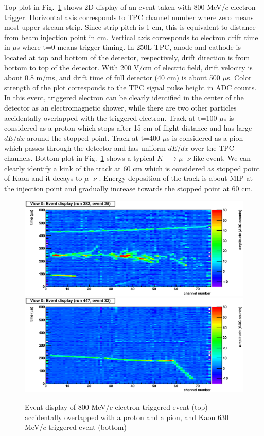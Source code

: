 Top plot in Fig.~\ref{Fig:Textbook} shows 2D display of an event taken with 800 MeV/$c$ electron trigger.
Horizontal axis corresponds to TPC channel number where zero means most upper stream strip. 
Since strip pitch is 1 cm, this is equivalent to distance from beam injection point in cm.
Vertical axis corresponds to electron drift time in $\mu$s
where t=0 means trigger timing. 
In 250L TPC, anode and cathode is located at top and bottom of the detector, respectively,
drift direction is from bottom to top of the detector.
With 200 V/cm of electric field, drift velocity is about 0.8 m/ms,
and drift time of full detector (40 cm) is about 500 $\mu$s.
Color strength of the plot corresponds to the TPC signal pulse height in ADC counts.
In this event, triggered electron can be clearly identified in the center of the detector
as an electromagnetic shower,  while there are two other particles 
accidentally overlapped with the triggered electron. 
Track at t=100 $\mu$s is considered as
a proton which stops after 15 cm of flight distance and 
has large $dE/dx$ around the stopped point.
Track at t=400 $\mu$s is considered as
a pion which passes-through the detector and 
has uniform $dE/dx$ over the TPC channels.
Bottom plot in Fig.~\ref{Fig:Textbook} shows a typical $K^+ \to\mu^+\nu$ like event.
We can clearly identify a kink of the track at 60 cm which is considered
as stopped point of Kaon and it decays to $\mu^+\nu$ .
Energy deposition of the track is about MIP at the injection point
and gradually increase towards the stopped point at 60 cm.

\begin{figure}[htbp]
 \begin{center}
  \includegraphics[width=1.0\hsize]{fig/Textbook.eps}
  \includegraphics[width=1.0\hsize]{fig/Kmunu.eps}
 \end{center}
 \caption{Event display of 800 MeV/$c$ electron triggered event (top) accidentally overlapped with a proton and a pion,
   and Kaon 630 MeV/$c$ triggered event (bottom)}
 \label{Fig:Textbook}
\end{figure}


